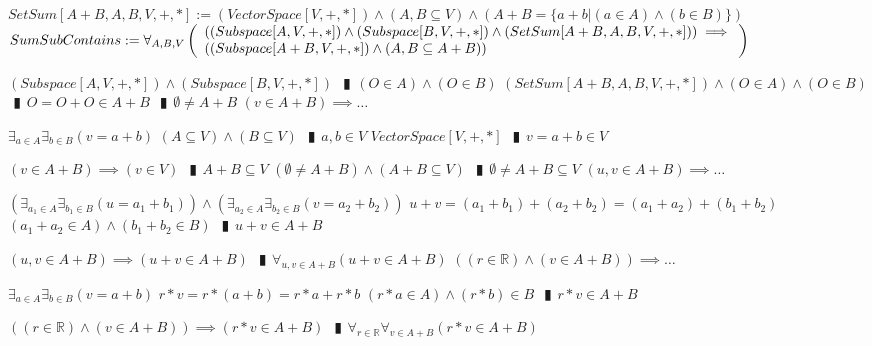 \documentclass{book}
\newcommand{\abr}{:=}
\newcommand{\pipe}{$\phantom{(}\vrectangleblack\phantom{)}$}
\newcommand{\pr}[1]{\left(#1\right)}
\begin{document}
\begin{shaded} %
  $SetSum[A + B, A, B, V, +, *] \abr (VectorSpace[V, +, *]) \land (A, B \subseteq V) \land \pr{A + B = \{a + b | (a \in A) \land (b \in B)\}}$ \\

  $SumSubContains \abr \forall_{A, B, V}\left(\begin{array}{ll}
    \pr{(Subspace[A, V, +, *]) \land (Subspace[B, V, +, *]) \land (SetSum[A + B, A, B, V, +, *])} \hfill \implies \hfill \\
    \pr{(Subspace[A + B, V, + ,*]) \land (A, B \subseteq A + B)}
  \end{array}\right)$
  \begin{enumerate}
    \lit $(Subspace[A, V, +, *]) \land (Subspace[B, V, +, *])$ \pipe $(O \in A) \land (O \in B)$
    \lit $(SetSum[A + B, A, B, V, +, *]) \land (O \in A) \land (O \in B)$ \pipe $O = O + O \in A + B$ \pipe $\emptyset \neq A + B$
    \lit $(v \in A + B) \implies \ldots$
    \begin{enumerate}
      \lit $\exists_{a \in A} \exists_{b \in B}(v = a + b)$
      \lit $(A \subseteq V) \land (B \subseteq V)$ \pipe $a, b \in V$
      \lit $VectorSpace[V, +, *]$ \pipe $v = a + b \in V$
    \end{enumerate}
    \lit $(v \in A + B) \implies (v \in V)$ \pipe $A + B \subseteq V$
    \lit $(\emptyset \neq A + B) \land (A + B \subseteq V)$ \pipe $\emptyset \neq A + B \subseteq V$
    \lit $(u, v \in A + B) \implies \ldots$
    \begin{enumerate}
      \lit $\pr{\exists_{a_1 \in A} \exists_{b_1 \in B}(u = a_1 + b_1)} \land \pr{\exists_{a_2 \in A} \exists_{b_2 \in B}(v = a_2 + b_2)}$
      \lit $u + v = (a_1 + b_1) + (a_2 + b_2) = (a_1 + a_2) + (b_1 + b_2)$
      \lit $(a_1 + a_2 \in A) \land (b_1 + b_2 \in B)$ \pipe $u + v \in A + B$
    \end{enumerate}
    \lit $(u, v \in A + B) \implies (u + v \in A + B)$ \pipe $\forall_{u, v \in A + B}(u + v \in A + B)$
    \lit $\pr{(r \in \mathbb{R}) \land (v \in A + B)} \implies \ldots$
    \begin{enumerate}
      \lit $\exists_{a \in A} \exists_{b \in B}(v = a + b)$
      \lit $r * v = r * (a + b) = r * a + r * b$
      \lit $(r * a \in A) \land (r * b) \in B$ \pipe $r * v \in A + B$
    \end{enumerate}
    \lit $\pr{(r \in \mathbb{R}) \land (v \in A + B)} \implies (r * v \in A + B)$ \pipe $\forall_{r \in \mathbb{R}} \forall_{v \in A + B}(r * v \in A + B)$

\end{enumerate}
\end{shaded}
\end{document}
